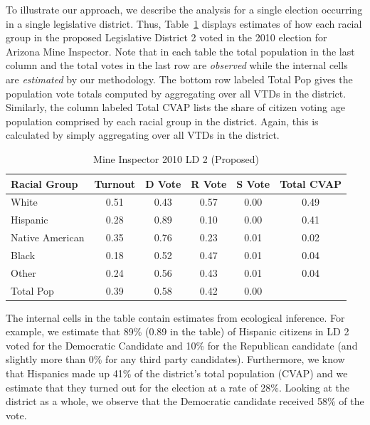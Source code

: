 \documentclass[12pt]{article}
\begin{document}
To illustrate our approach, we describe the analysis for a single election occurring in a single legislative district. Thus, Table~\ref{smine_cvap_ld_2_ex} displays estimates of how each racial group in the proposed Legislative District 2 voted in the 2010 election for Arizona Mine Inspector. Note that in each table the total population in the last column and the total votes in the last row are {\it observed} while the internal cells are {\it estimated} by our methodology. The bottom row labeled Total Pop
gives the population vote totals computed by aggregating over all VTDs
in the district.  Similarly, the column labeled Total CVAP lists the
share of citizen voting age population comprised by each racial group
in the district.  Again, this is calculated by simply aggregating over
all VTDs in the district.

\begin{table}[ht]
\begin{center}
\caption{\label{smine_cvap_ld_2_ex}Mine Inspector 2010 LD 2 (Proposed)}
\begin{tabular}{lccccc}
  \hline
Racial Group & Turnout & D Vote & R Vote & S Vote & Total CVAP \\ 
  \hline
White & 0.51 & 0.43 & 0.57 & 0.00 & 0.49 \\ 
  Hispanic & 0.28 & 0.89 & 0.10 & 0.00 & 0.41 \\ 
  Native American & 0.35 & 0.76 & 0.23 & 0.01 & 0.02 \\ 
  Black & 0.18 & 0.52 & 0.47 & 0.01 & 0.04 \\ 
  Other & 0.24 & 0.56 & 0.43 & 0.01 & 0.04 \\ 
  Total Pop & 0.39 & 0.58 & 0.42 & 0.00 &  \\ 
   \hline
\end{tabular}
\end{center}
\end{table}

The internal cells in the table contain estimates from ecological
inference. For example, we estimate that 89\% (0.89 in the table) of
Hispanic citizens in LD 2 voted for the Democratic Candidate and 10\%
for the Republican candidate (and slightly more than 0\% for any third party candidates).
Furthermore, we know that Hispanics made up 41\% of the district's
total population (CVAP) and we estimate that they turned out for the
election at a rate of 28\%.  Looking at the district as a whole, we
observe that the Democratic candidate received 58\% of the vote.
\end{document}
